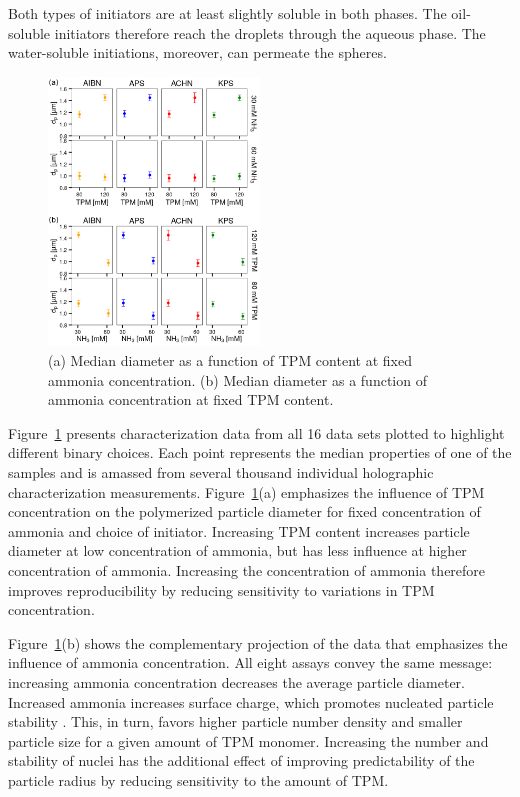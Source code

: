 \documentclass[journal=langd5,manuscript=article]{achemso}
\begin{document}
Both types of initiators are at least slightly soluble in
both phases.  The oil-soluble initiators therefore reach the
droplets through the aqueous phase.  The water-soluble
initiations, moreover, can permeate the spheres.

\begin{figure}[!t]
  \centering
  \includegraphics[width=0.5\textwidth]{longitudinal_summary_02}
  \caption{
    (a) Median diameter as a function of TPM content
    at fixed ammonia concentration.
    (b) Median diameter as a function of ammonia
    concentration at fixed TPM content.}
  \label{fig:choices}
\end{figure}

Figure~\ref{fig:choices} presents
characterization data from all \num{16} data sets plotted to highlight different
binary choices.
Each point represents the median properties of
one of the samples and is amassed 
from several thousand
individual holographic characterization measurements.
Figure~\ref{fig:choices}(a) 
emphasizes the influence of TPM concentration
on the polymerized particle diameter
for fixed concentration of 
ammonia and choice 
of initiator.
Increasing TPM content increases particle
diameter at low concentration of ammonia,
but has less influence at higher concentration
of ammonia.
Increasing the concentration of 
ammonia
therefore improves reproducibility by 
reducing sensitivity to variations in TPM concentration.

Figure~\ref{fig:choices}(b) shows the complementary projection
of the data that emphasizes the influence of
ammonia concentration. 
All eight assays convey the same message:
increasing ammonia concentration
decreases the average particle diameter.
Increased ammonia increases surface charge, 
which promotes nucleated particle stability \cite{vanderwel17}. 
This, in turn, favors higher particle number density 
and smaller particle size for a given amount of TPM monomer.
Increasing the number and stability of nuclei 
has the additional effect of improving predictability
of the particle radius by reducing sensitivity to the amount
of TPM.
\end{document}
